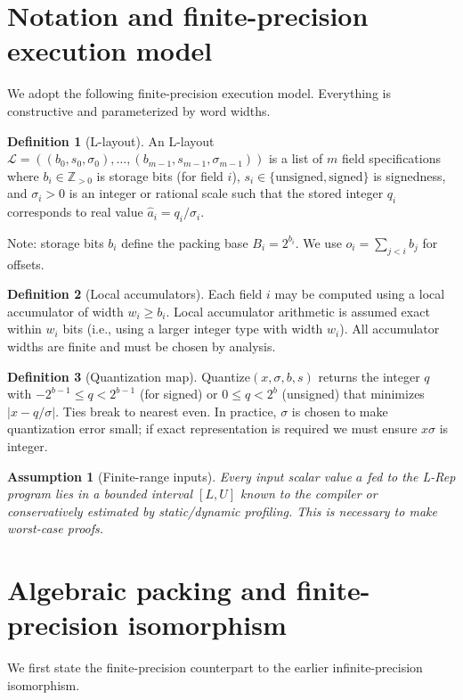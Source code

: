 \documentclass[11pt]{article}
\theoremstyle{definition}
\newtheorem{definition}{Definition}[section]
\theoremstyle{plain}
\newtheorem{assumption}{Assumption}[section]
\begin{document}
\section{Notation and finite-precision execution model}
\label{sec:model}
We adopt the following finite-precision execution model.  Everything is constructive and parameterized by word widths.

\begin{definition}[L-layout]
An L-layout $\mathcal{L}=((b_0,s_0,\sigma_0),\dots,(b_{m-1},s_{m-1},\sigma_{m-1}))$ is a list of $m$ field specifications where $b_i\in\mathbb{Z}_{>0}$ is storage bits (for field $i$), $s_i\in\{\mathrm{unsigned},\mathrm{signed}\}$ is signedness, and $\sigma_i>0$ is an integer or rational scale such that the stored integer $q_i$ corresponds to real value $\hat a_i = q_i/\sigma_i$.
\end{definition}

Note: storage bits $b_i$ define the packing base $B_i = 2^{b_i}$.  We use $o_i = \sum_{j<i} b_j$ for offsets.

\begin{definition}[Local accumulators]
Each field $i$ may be computed using a local accumulator of width $w_i\ge b_i$.  Local accumulator arithmetic is assumed exact within $w_i$ bits (i.e., using a larger integer type with width $w_i$).  All accumulator widths are finite and must be chosen by analysis.
\end{definition}

\begin{definition}[Quantization map]
Quantize$(x,\sigma,b,s)$ returns the integer $q$ with $-2^{b-1}\le q < 2^{b-1}$ (for signed) or $0\le q < 2^b$ (unsigned) that minimizes $|x - q/\sigma|$.  Ties break to nearest even.  In practice, $\sigma$ is chosen to make quantization error small; if exact representation is required we must ensure $x\sigma$ is integer.
\end{definition}

\begin{assumption}[Finite-range inputs]
Every input scalar value $a$ fed to the L-Rep program lies in a bounded interval $[L,U]$ known to the compiler or conservatively estimated by static/dynamic profiling.  This is necessary to make worst-case proofs.
\end{assumption}

\section{Algebraic packing and finite-precision isomorphism}
\label{sec:finite}
We first state the finite-precision counterpart to the earlier infinite-precision isomorphism.
\end{document}
